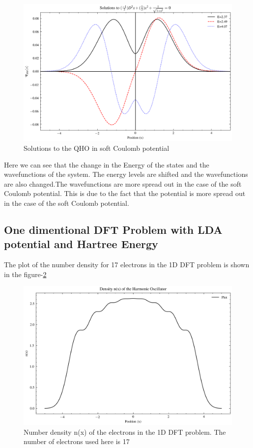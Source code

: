\documentclass{article}
\begin{document}
\begin{multicols}{2}
\begin{figure}[H]
    \centering
    \includegraphics[width = \columnwidth]{Images/soft_coulomb.png}
    \caption{Solutions to the QHO in soft Coulomb potential}
    \label{coulombqho}
\end{figure}

Here we can see that the change in the Energy of the states and the wavefunctions of the system. The energy levels are shifted and the wavefunctions are also changed.The wavefunctions are more spread out in the case of the soft Coulomb potential. This is due to the fact that the potential is more spread out in the case of the soft Coulomb potential.


\subsection{One dimentional DFT Problem with LDA potential and Hartree Energy}



The plot of the number density for 17 electrons in the 1D DFT problem is shown in the figure-\ref{numden}

\begin{figure}[H]
    \centering
    \includegraphics[width = \columnwidth]{Images/density.png}
    \caption{Number density n(x) of the electrons in the 1D DFT problem. The number of electrons used here is 17}
    \label{numden}
\end{figure}


\end{multicols}
\end{document}
